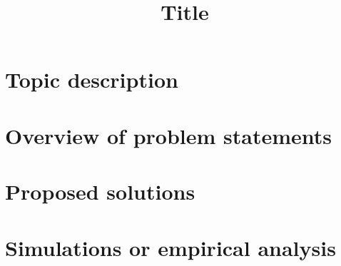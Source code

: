 \documentclass[11pt]{article}
\title{Title}
\author{}
\date{}
\begin{document}
\maketitle
\begin{abstract}
\end{abstract}

\section{Topic description}

\section{Overview of problem statements}

\section{Proposed solutions}

\section{Simulations or empirical analysis}

\end{document}
